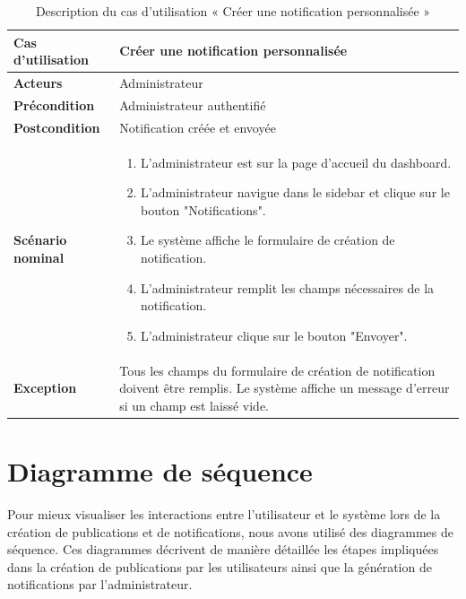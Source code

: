 \begin{sloppypar}
\begin{table}[h]
\centering
\begin{tabular}{|p{3cm}|p{11cm}|}
\hline
\textbf{Cas d'utilisation } & Créer une notification personnalisée \\
\hline
\textbf{Acteurs} & Administrateur \\
\hline
\textbf{Précondition} & Administrateur authentifié \\
\hline
\textbf{Postcondition} & Notification créée et envoyée \\
\hline
\textbf{Scénario nominal} & 
\begin{enumerate}
    \item L'administrateur est sur la page d'accueil du dashboard.
    \item L'administrateur navigue dans le sidebar et clique sur le bouton "Notifications".
    \item Le système affiche le formulaire de création de notification.
    \item L'administrateur remplit les champs nécessaires de la notification.
    \item L'administrateur clique sur le bouton "Envoyer".
\end{enumerate} \\
\hline
\textbf{Exception} & 
Tous les champs du formulaire de création de notification doivent être remplis. Le système affiche un message d'erreur si un champ est laissé vide. \\
\hline
\end{tabular}
\caption{Description du cas d’utilisation « Créer une notification personnalisée »}
\end{table}
\vspace{-1cm}
\section{Diagramme de séquence }
\vspace{-4mm}
Pour mieux visualiser les interactions entre l'utilisateur et le système lors de la création de publications et de notifications, nous avons utilisé des diagrammes de séquence. Ces diagrammes décrivent de manière détaillée les étapes impliquées dans la création de publications par les utilisateurs ainsi que la génération de notifications par l'administrateur.
\vspace{-1.5cm}

\end{sloppypar}

